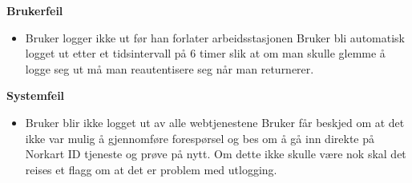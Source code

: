 \textbf{Brukerfeil}
\begin{itemize}
\item Bruker logger ikke ut før han forlater arbeidsstasjonen
\newline Bruker bli automatisk logget ut etter et tidsintervall på 6 timer slik at om man skulle glemme å logge seg ut må man reautentisere seg når man returnerer.
\end{itemize}

\bigskip \textbf{Systemfeil}
\begin{itemize}
\item Bruker blir ikke logget ut av alle webtjenestene
\newline Bruker får beskjed om at det ikke var mulig å gjennomføre forespørsel og bes om å gå inn direkte på Norkart ID tjeneste og prøve på nytt. Om dette ikke skulle være nok skal det reises et flagg om at det er problem med utlogging.
\end{itemize}


